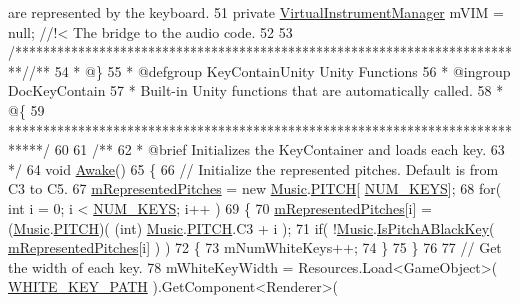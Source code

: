 \begin{DoxyCodeInclude}
{       are represented by the keyboard.}
51 \textcolor{comment}{}    \textcolor{keyword}{private} \hyperlink{class_virtual_instrument_manager}{VirtualInstrumentManager} mVIM = null; \textcolor{comment}{//!< The bridge to the audio
       code.}
52 \textcolor{comment}{}
53     \textcolor{comment}{/*************************************************************************/}\textcolor{comment}{/** }
54 \textcolor{comment}{    * @\}}
55 \textcolor{comment}{    * @defgroup KeyContainUnity Unity Functions}
56 \textcolor{comment}{    * @ingroup DocKeyContain}
57 \textcolor{comment}{    * Built-in Unity functions that are automatically called.}
58 \textcolor{comment}{    * @\{}
59 \textcolor{comment}{    *****************************************************************************/}
60     \textcolor{comment}{}
61 \textcolor{comment}{    /**}
62 \textcolor{comment}{     * @brief Initializes the KeyContainer and loads each key.}
63 \textcolor{comment}{    */}
64     \textcolor{keywordtype}{void} \hyperlink{group___key_contain_unity_ga9e307b409b1e07b2be51a21afe5d7379}{Awake}()
65     \{
66         \textcolor{comment}{// Initialize the represented pitches. Default is from C3 to C5.}
67         \hyperlink{group___key_contain_priv_var_ga103945a6efe3469191e5253d13fec5be}{mRepresentedPitches} = \textcolor{keyword}{new} \hyperlink{class_music}{Music}.\hyperlink{group___music_enums_ga508f69b199ea518f935486c990edac1d}{PITCH}[
      \hyperlink{group___key_contain_const_gaa8fe6473e6396976e52c5793f027380e}{NUM\_KEYS}];
68         \textcolor{keywordflow}{for}( \textcolor{keywordtype}{int} i = 0; i < \hyperlink{group___key_contain_const_gaa8fe6473e6396976e52c5793f027380e}{NUM\_KEYS}; i++ )
69         \{
70             \hyperlink{group___key_contain_priv_var_ga103945a6efe3469191e5253d13fec5be}{mRepresentedPitches}[i] = (\hyperlink{class_music}{Music}.\hyperlink{group___music_enums_ga508f69b199ea518f935486c990edac1d}{PITCH})( (\textcolor{keywordtype}{int})
      \hyperlink{class_music}{Music}.\hyperlink{group___music_enums_ga508f69b199ea518f935486c990edac1d}{PITCH}.C3 + i );
71             \textcolor{keywordflow}{if}( !\hyperlink{class_music}{Music}.\hyperlink{group___music_stat_func_gacc2c1a66df7197225f61c5737f794065}{IsPitchABlackKey}( 
      \hyperlink{group___key_contain_priv_var_ga103945a6efe3469191e5253d13fec5be}{mRepresentedPitches}[i] ) )
72             \{
73                 mNumWhiteKeys++;
74             \}
75         \}
76 
77         \textcolor{comment}{// Get the width of each key.}
78         mWhiteKeyWidth = Resources.Load<GameObject>( \hyperlink{group___key_contain_const_ga8ce7e53d5c067095ee26b96fcc522584}{WHITE\_KEY\_PATH} ).GetComponent<Renderer>(

\end{DoxyCodeInclude}
